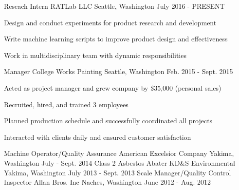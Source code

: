 

\begin{cventries}

  \cventry
    {Reseach Intern} %
    {RATLab LLC} %
    {Seattle, Washington} %
    {July 2016 - PRESENT} %
    {
      \begin{cvitems} %
        \item {Design and conduct experiments for product research and development}
        \item {Write machine learning scripts to improve product design and effectiveness}
        \item {Work in multidisciplinary team with dynamic responsibilities}
      \end{cvitems}
    }

  \cventry
    {Manager} %
    {College Works Painting} %
    {Seattle, Washington} %
    {Feb. 2015 - Sept. 2015} %
    {
      \begin{cvitems} %
        \item {Acted as project manager and grew company by \$35,000 (personal sales)}
        \item {Recruited, hired, and trained 3 employees}
        \item {Planned production schedule and successfully coordinated all projects}
        \item {Interacted with clients daily and ensured customer satisfaction}
      \end{cvitems}
    }

  \cventry
    {Machine Operator/Quality Assurance} %
    {American Excelsior Company} %
    {Yakima, Washington} %
    {July - Sept. 2014} %
    {}
\vspace*{-0.3cm}    
  \cventry
    {Class 2 Asbestos Abater} %
    {KD\&S Environmental} %
    {Yakima, Washington} %
    {July 2013 - Sept. 2013} %
    {}
\vspace*{-0.3cm}    
  \cventry
    {Scale Manager/Quality Control Inspector} %
    {Allan Bros. Inc} %
    {Naches, Washington} %
    {June 2012 - Aug. 2012} %
    {}
\vspace*{-0.3cm}
\end{cventries}
